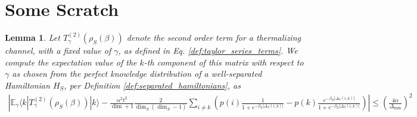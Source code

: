 \documentclass{article}
\newtheorem{lemma}[theorem]{Lemma}
\newcommand{\ket}[1]{|#1\rangle}
\newcommand{\bra}[1]{\langle #1|}
\newcommand{\parens}[1]{\left( #1 \right)}
\newcommand{\abs}[1]{\left| #1 \right|}
\begin{document}
\section{Some Scratch}
\begin{lemma} \label{lem:expected_second_order_term}
    Let $T_{\gamma}^{(2)}(\rho_S(\beta))$ denote the second order term for a thermalizing channel, with a fixed value of $\gamma$, as defined in Eq. \eqref{def:taylor_series_terms}. We compute the expectation value of the $k$-th component of this matrix with respect to $\gamma$ as chosen from the perfect knowledge distribution of a well-separated Hamiltonian $H_S$, per Definition \ref{def:separated_hamiltonians}, as 
    \begin{align}
        \abs{\mathbb{E}_{\gamma} \bra{k} T_{\gamma}^{(2)}(\rho_S(\beta)) \ket{k} - \frac{\alpha^2 t^2}{\dim + 1} \frac{2}{\dim_S (\dim_S - 1)} \sum_{i \neq k} \parens{ p(i) \frac{1}{1 + e^{-\beta_E |\Delta_S(i,k)|}}  - p(k) \frac{e^{-\beta_E |\Delta_S(i,k)|}}{1 + e^{-\beta_E |\Delta_S(i,k)|}} }} \leq  \parens{\frac{4 \alpha}{\Delta_{\min}}}^2
    \end{align}
\end{lemma}
\end{document}
